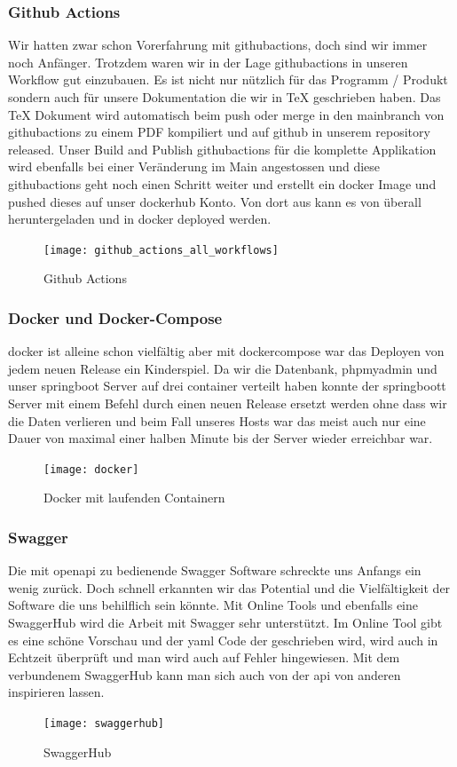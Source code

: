 \documentclass[../main.tex]{subfiles}
\begin{document}
	\subsubsection{Github Actions}
	Wir hatten zwar schon Vorerfahrung mit \gls{githubactions}, doch sind wir immer noch Anfänger. Trotzdem waren wir in der Lage \gls{githubactions} in unseren Workflow gut einzubauen. Es ist nicht nur nützlich für das Programm / Produkt sondern auch für unsere Dokumentation die wir in TeX geschrieben haben. Das TeX Dokument wird automatisch beim \gls{push} oder \gls{merge} in den \gls{mainbranch} von \gls{githubactions} zu einem PDF kompiliert und auf \gls{github} in unserem \gls{repository} released. Unser Build and Publish \gls{githubactions} für die komplette Applikation wird ebenfalls bei einer Veränderung im Main angestossen und diese \gls{githubactions} geht noch einen Schritt weiter und erstellt ein \gls{docker} Image und pushed dieses auf unser \gls{dockerhub} Konto. Von dort aus kann es von überall heruntergeladen und in \gls{docker} deployed werden.
	\begin{figure}[H]
		\centering
		\texttt{[image: github\_actions\_all\_workflows]} 
		\caption{Github Actions}
		\label{fig:github_actions_all_workflows}
	\end{figure}
	
	\subsubsection{Docker und Docker-Compose}
	\gls{docker} ist alleine schon vielfältig aber mit \gls{dockercompose} war das Deployen von jedem neuen Release ein Kinderspiel. Da wir die Datenbank, \gls{phpmyadmin} und unser \gls{springboot} Server auf drei \gls{container} verteilt haben konnte der \gls{springboot}t Server mit einem Befehl durch einen neuen Release ersetzt werden ohne dass wir die Daten verlieren und beim Fall unseres Hosts war das meist auch nur eine Dauer von maximal einer halben Minute bis der Server wieder erreichbar war.
	\begin{figure}[H]
		\centering
		\texttt{[image: docker]} 
		\caption{Docker mit laufenden Containern}
		\label{fig:docker}
	\end{figure}
	
	\subsubsection{Swagger}
	Die mit \gls{openapi} zu bedienende Swagger Software schreckte uns Anfangs ein wenig zurück. Doch schnell erkannten wir das Potential und die Vielfältigkeit der Software die uns behilflich sein könnte. Mit Online Tools und ebenfalls eine SwaggerHub wird die Arbeit mit Swagger sehr unterstützt. Im Online Tool gibt es eine schöne Vorschau und der \gls{yaml} Code der geschrieben wird, wird auch in Echtzeit überprüft und man wird auch auf Fehler hingewiesen. Mit dem verbundenem SwaggerHub kann man sich auch von der \gls{api} von anderen inspirieren lassen.
		\begin{figure}[H]
		\centering
		\texttt{[image: swaggerhub]} 
		\caption{SwaggerHub}
		\label{fig:swaggerhub}
	\end{figure}
	
\end{document}
